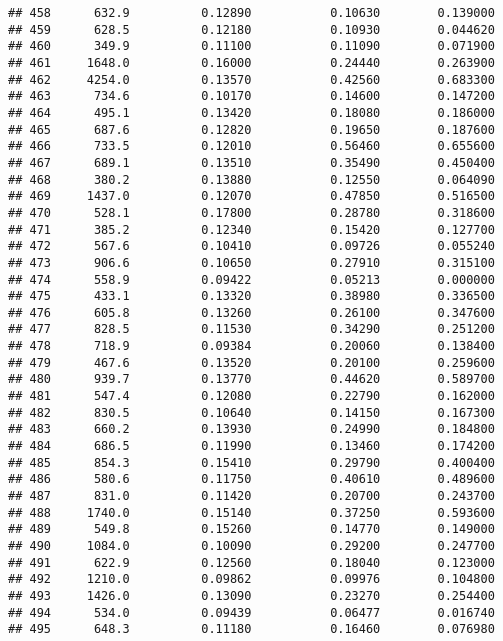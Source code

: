 \documentclass[
]{article}
\begin{document}
\begin{verbatim}
## 458      632.9          0.12890           0.10630        0.139000
## 459      628.5          0.12180           0.10930        0.044620
## 460      349.9          0.11100           0.11090        0.071900
## 461     1648.0          0.16000           0.24440        0.263900
## 462     4254.0          0.13570           0.42560        0.683300
## 463      734.6          0.10170           0.14600        0.147200
## 464      495.1          0.13420           0.18080        0.186000
## 465      687.6          0.12820           0.19650        0.187600
## 466      733.5          0.12010           0.56460        0.655600
## 467      689.1          0.13510           0.35490        0.450400
## 468      380.2          0.13880           0.12550        0.064090
## 469     1437.0          0.12070           0.47850        0.516500
## 470      528.1          0.17800           0.28780        0.318600
## 471      385.2          0.12340           0.15420        0.127700
## 472      567.6          0.10410           0.09726        0.055240
## 473      906.6          0.10650           0.27910        0.315100
## 474      558.9          0.09422           0.05213        0.000000
## 475      433.1          0.13320           0.38980        0.336500
## 476      605.8          0.13260           0.26100        0.347600
## 477      828.5          0.11530           0.34290        0.251200
## 478      718.9          0.09384           0.20060        0.138400
## 479      467.6          0.13520           0.20100        0.259600
## 480      939.7          0.13770           0.44620        0.589700
## 481      547.4          0.12080           0.22790        0.162000
## 482      830.5          0.10640           0.14150        0.167300
## 483      660.2          0.13930           0.24990        0.184800
## 484      686.5          0.11990           0.13460        0.174200
## 485      854.3          0.15410           0.29790        0.400400
## 486      580.6          0.11750           0.40610        0.489600
## 487      831.0          0.11420           0.20700        0.243700
## 488     1740.0          0.15140           0.37250        0.593600
## 489      549.8          0.15260           0.14770        0.149000
## 490     1084.0          0.10090           0.29200        0.247700
## 491      622.9          0.12560           0.18040        0.123000
## 492     1210.0          0.09862           0.09976        0.104800
## 493     1426.0          0.13090           0.23270        0.254400
## 494      534.0          0.09439           0.06477        0.016740
## 495      648.3          0.11180           0.16460        0.076980

\end{verbatim}
\end{document}
